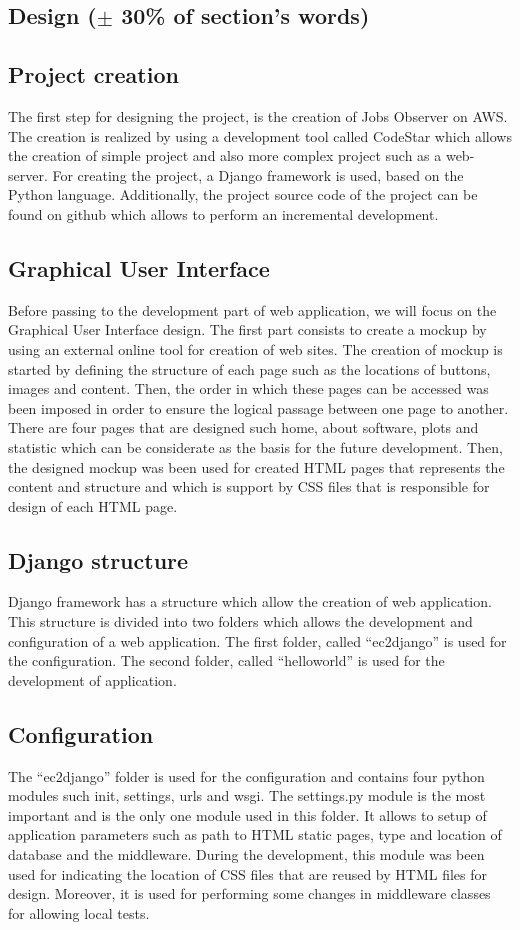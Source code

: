 \documentclass[conference,compsoc]{IEEEtran}
\begin{document}
\subsection{Design ($\pm$ 30\% of section's words)}
\subsection{Project creation}
The first step for designing the project, is the creation of Jobs Observer on AWS. The creation is realized by using a development tool called CodeStar which allows the creation of simple project and also more complex project such as a web-server. For creating the project, a Django framework is used, based on the Python language. Additionally, the project source code of the project can be found on github which allows to perform an incremental development.
 
\subsection{Graphical User Interface}
Before passing to the development part of web application, we will focus on the Graphical User Interface design. The first part consists to create a mockup by using an external online tool for creation of web sites. The creation of mockup is started by defining the structure of each page such as the locations of buttons, images and content. Then, the order in which these pages can be accessed was been imposed in order to ensure the logical passage between one page to another. There are four pages that are designed such home, about software, plots and statistic which can be considerate as the basis for the future development. 
Then, the designed mockup was been used for created HTML pages that represents the content and structure and which is support by CSS files that is responsible for design of each HTML page. 

\subsection{Django structure}
Django framework has a structure which allow the creation of web application. This structure is divided into two folders which allows the development and configuration of a web application. The first folder, called “ec2django” is used for the configuration. The second folder, called “helloworld” is used for the development of application.

\subsection{Configuration}
The “ec2django” folder is used for the configuration and contains four python modules such init, settings, urls and wsgi. The settings.py module is the most important and is the only one module used in this folder. It allows to setup of application parameters such as path to HTML static pages, type and location of database and the middleware. During the development, this module was been used for indicating the location of CSS files that are reused by HTML files for design. Moreover, it is used for performing some changes in middleware classes for allowing local tests. 
\end{document}
